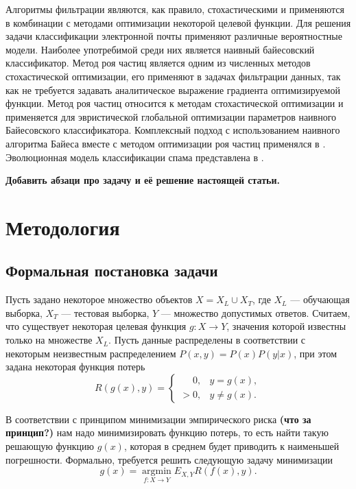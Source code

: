 \documentclass[12pt]{article}
\begin{document}
Алгоритмы фильтрации являются, как правило, стохастическими \cite{Garg2021} 
и применяются в комбинации с методами оптимизации некоторой целевой функции. 
Для решения задачи классификации электронной почты применяют различные вероятностные модели. Наиболее употребимой среди них является наивный байесовский классификатор. Метод роя частиц является одним из численных методов стохастической оптимизации, его применяют в задачах фильтрации данных, так как не требуется задавать аналитическое выражение градиента оптимизируемой функции. 
Метод роя частиц относится к методам стохастической оптимизации и применяется для эвристической глобальной оптимизации параметров наивного Байесовского классификатора. Комплексный подход с использованием наивного алгоритма Байеса вместе с методом оптимизации роя частиц применялся в \cite{Parmar2020}. 
Эволюционная модель классификации спама представлена в \cite{Mohammad2020}. 

{
\bf\color{amaranth}
Добавить абзаци про задачу и её решение настоящей статьи.
}



\section{Методология}
\subsection{Формальная постановка задачи}
Пусть задано некоторое множество объектов $ X = X_L \cup X_T $, где 
$X_L$ --- обучающая выборка, 
$X_T$ --- тестовая выборка, 
$Y$ --- множество допустимых ответов. Считаем, что существует некоторая целевая функция $g: X \rightarrow Y$, значения которой известны только на множестве $X_L$. Пусть данные распределены в соответствии с некоторым неизвестным распределением $P(x,y) = P(x) P(y|x)$, при этом задана некоторая функция потерь
$$
R(g(x), y) = 
\begin{cases} 
\phantom{>}0, & y = g(x), \\
> 0, & y \neq g(x).
\end{cases}
$$

В соответствии с принципом минимизации эмпирического риска 
{\bf\color{amaranth} (что за принцип?)} нам надо минимизировать функцию потерь, то есть найти такую решающую функцию $g(x)$, которая в среднем будет приводить к наименьшей погрешности. Формально, требуется решить следующую задачу минимизации
$$
g(x) = \operatorname*{argmin}_{f: X \rightarrow Y} E_{X,Y} R(f(x), y).
$$
\end{document}
